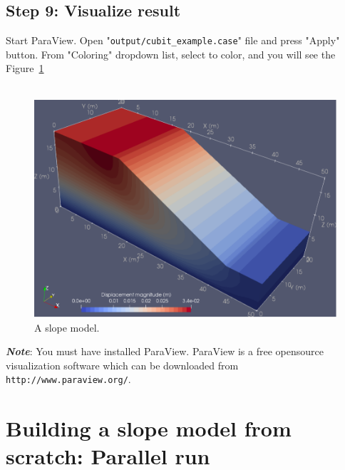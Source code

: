 \subsection*{Step 9: Visualize result}

Start ParaView. Open "\texttt{output/cubit\_example.case}" file and press "Apply" button. From "Coloring" dropdown list, select  to color, and you will see the Figure~\ref{fig:disp}\\
\\
\begin{figure}[ht]
\centering
\includegraphics[scale=0.7]{cubit_example_disp}
\caption{A slope model.}
\label{fig:disp}
\end{figure}

\textbf{\emph{Note}}: You must have installed ParaView. ParaView is a free opensource visualization software which
can be downloaded from \texttt{http://www.paraview.org/}.

\section{Building a slope model from scratch: Parallel run}
\label{sec:cubit}

